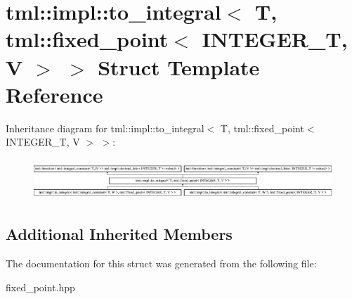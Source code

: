 \hypertarget{structtml_1_1impl_1_1to__integral_3_01T_00_01tml_1_1fixed__point_3_01INTEGER__T_00_01V_01_4_01_4}{\section{tml\+:\+:impl\+:\+:to\+\_\+integral$<$ T, tml\+:\+:fixed\+\_\+point$<$ I\+N\+T\+E\+G\+E\+R\+\_\+\+T, V $>$ $>$ Struct Template Reference}
\label{structtml_1_1impl_1_1to__integral_3_01T_00_01tml_1_1fixed__point_3_01INTEGER__T_00_01V_01_4_01_4}
}
Inheritance diagram for tml\+:\+:impl\+:\+:to\+\_\+integral$<$ T, tml\+:\+:fixed\+\_\+point$<$ I\+N\+T\+E\+G\+E\+R\+\_\+\+T, V $>$ $>$\+:\begin{figure}[H]
\begin{center}
\leavevmode
\includegraphics[height=1.546961cm]{structtml_1_1impl_1_1to__integral_3_01T_00_01tml_1_1fixed__point_3_01INTEGER__T_00_01V_01_4_01_4}
\end{center}
\end{figure}
\subsection*{Additional Inherited Members}


The documentation for this struct was generated from the following file\+:\begin{DoxyCompactItemize}
\item 
fixed\+\_\+point.\+hpp\end{DoxyCompactItemize}
